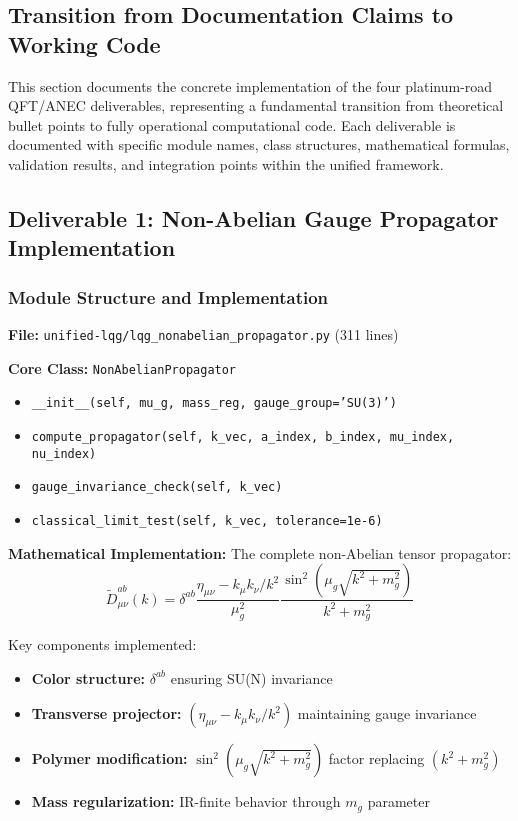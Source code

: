 \documentclass[11pt]{article}
\begin{document}
\subsection{Transition from Documentation Claims to Working Code}

This section documents the concrete implementation of the four platinum-road QFT/ANEC deliverables, representing a fundamental transition from theoretical bullet points to fully operational computational code. Each deliverable is documented with specific module names, class structures, mathematical formulas, validation results, and integration points within the unified framework.

\subsection{Deliverable 1: Non-Abelian Gauge Propagator Implementation}

\subsubsection{Module Structure and Implementation}
\textbf{File:} \texttt{unified-lqg/lqg\_nonabelian\_propagator.py} (311 lines)

\textbf{Core Class:} \texttt{NonAbelianPropagator}
\begin{itemize}
    \item \texttt{\_\_init\_\_(self, mu\_g, mass\_reg, gauge\_group='SU(3)')}
    \item \texttt{compute\_propagator(self, k\_vec, a\_index, b\_index, mu\_index, nu\_index)}
    \item \texttt{gauge\_invariance\_check(self, k\_vec)}
    \item \texttt{classical\_limit\_test(self, k\_vec, tolerance=1e-6)}
\end{itemize}

\textbf{Mathematical Implementation:}
The complete non-Abelian tensor propagator:
\begin{equation}
\tilde{D}^{ab}_{\mu\nu}(k) = \delta^{ab} \frac{\eta_{\mu\nu} - k_\mu k_\nu/k^2}{\mu_g^2} \frac{\sin^2(\mu_g\sqrt{k^2+m_g^2})}{k^2+m_g^2}
\end{equation}

Key components implemented:
\begin{itemize}
    \item \textbf{Color structure:} $\delta^{ab}$ ensuring SU(N) invariance
    \item \textbf{Transverse projector:} $(\eta_{\mu\nu} - k_\mu k_\nu/k^2)$ maintaining gauge invariance
    \item \textbf{Polymer modification:} $\sin^2(\mu_g\sqrt{k^2+m_g^2})$ factor replacing $(k^2+m_g^2)$
    \item \textbf{Mass regularization:} IR-finite behavior through $m_g$ parameter
\end{itemize}
\end{document}
